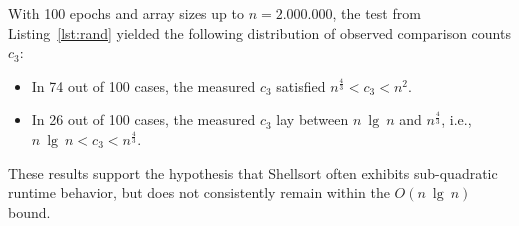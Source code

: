 With 100 epochs and array sizes up to $n = 2.000.000$, the test from Listing~\ref{lst:rand} yielded the following distribution of observed comparison counts $c_3$:

\begin{itemize}
    \item In 74 out of 100 cases, the measured $c_3$ satisfied $n^{\frac{4}{3}} < c_3 < n^2$.
    \item In 26 out of 100 cases, the measured $c_3$ lay between $n\ \lg\ n$ and $n^{\frac{4}{3}}$, i.e., $n\ \lg\ n < c_3 < n^{\frac{4}{3}}$.
\end{itemize}

These results support the hypothesis that Shellsort often exhibits sub-quadratic runtime behavior, but does not consistently remain within the $O(n\ \lg\ n)$ bound.



